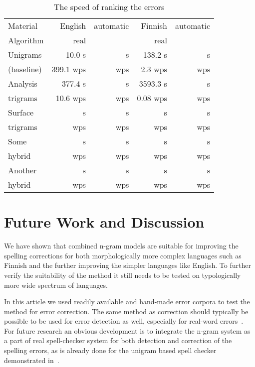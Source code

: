 \documentclass[11pt,a4paper]{article}
\begin{document}
\begin{table}[h]
  \begin{center}
    \caption{The speed of ranking the errors
    \label{table:speed-eval}}
    \begin{scriptsize}
      \begin{tabular}{l|rrrr}
        \hline
        Material  & English & automatic & Finnish & automatic \\
        Algorithm & real    &           & real    &           \\
        \hline
        Unigrams   &    10.0 s &      s & 138.2 s &     s  \\
        (baseline) & 399.1 wps &    wps & 2.3 wps &   wps  \\
        \hline
        Analysis &   377.4 s &     s & 3593.3 s &     s  \\
        trigrams & 10.6  wps &   wps & 0.08 wps &   wps  \\
        \hline
        Surface  &      s &     s &     s &     s  \\
        trigrams &    wps &   wps &   wps &   wps  \\
        \hline
        Some     &      s &     s &     s &     s  \\
        hybrid   &    wps &   wps &   wps &   wps  \\
        \hline
        Another  &      s &     s &     s &     s  \\
        hybrid   &    wps &   wps &   wps &   wps  \\
        \hline
      \end{tabular}
    \end{scriptsize}
  \end{center}
\end{table}


\section{Future Work and Discussion}
\label{sec:future-work}

We have shown that combined n-gram models are suitable for improving the
spelling corrections for both morphologically more complex languages such as
Finnish and the further improving the simpler languages like English. To
further verify the suitability of the method it still needs to be tested on
typologically more wide spectrum of languages.

In this article we used readily available and hand-made error corpora to test
the method for error correction. The same method as correction should typically
be possible to be used for error detection as well, especially for real-word
errors~\cite{mays/1991}. For future research an obvious development is to
integrate the n-gram system as a part of real spell-checker system for both
detection and correction of the spelling errors, as is already done for the
unigram based spell checker demonstrated in~\cite{pirinen/2010/lrec}.
\end{document}
